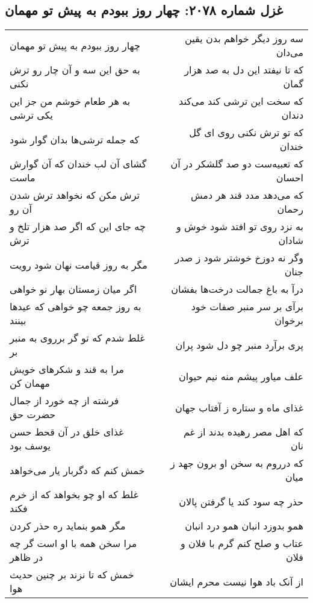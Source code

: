 \begin{center}
\section*{غزل شماره ۲۰۷۸: چهار روز ببودم به پیش تو مهمان}
\label{sec:2078}
\begin{longtable}{l p{0.5cm} r}
چهار روز ببودم به پیش تو مهمان
&&
سه روز دیگر خواهم بدن یقین می‌دان
\\
به حق این سه و آن چار رو ترش نکنی
&&
که تا نیفتد این دل به صد هزار گمان
\\
به هر طعام خوشم من جز این یکی ترشی
&&
که سخت این ترشی کند می‌کند دندان
\\
که جمله ترشی‌ها بدان گوار شود
&&
که تو ترش نکنی روی ای گل خندان
\\
گشای آن لب خندان که آن گوارش ماست
&&
که تعبیه‌ست دو صد گلشکر در آن احسان
\\
ترش مکن که نخواهد ترش شدن آن رو
&&
که می‌دهد مدد قند هر دمش رحمان
\\
چه جای این که اگر صد هزار تلخ و ترش
&&
به نزد روی تو افتد شود خوش و شادان
\\
مگر به روز قیامت نهان شود رویت
&&
وگر نه دوزخ خوشتر شود ز صدر جنان
\\
اگر میان زمستان بهار نو خواهی
&&
درآ به باغ جمالت درخت‌ها بفشان
\\
به روز جمعه چو خواهی که عیدها بینند
&&
برآی بر سر منبر صفات خود برخوان
\\
غلط شدم که تو گر برروی به منبر بر
&&
پری برآرد منبر چو دل شود پران
\\
مرا به قند و شکرهای خویش مهمان کن
&&
علف میاور پیشم منه نیم حیوان
\\
فرشته از چه خورد از جمال حضرت حق
&&
غذای ماه و ستاره ز آفتاب جهان
\\
غذای خلق در آن قحط حسن یوسف بود
&&
که اهل مصر رهیده بدند از غم نان
\\
خمش کنم که دگربار یار می‌خواهد
&&
که درروم به سخن او برون جهد ز میان
\\
غلط که او چو بخواهد که از خرم فکند
&&
حذر چه سود کند یا گرفتن پالان
\\
مگر همو بنماید ره حذر کردن
&&
همو بدوزد انبان همو درد انبان
\\
مرا سخن همه با او است گر چه در ظاهر
&&
عتاب و صلح کنم گرم با فلان و فلان
\\
خمش که تا نزند بر چنین حدیث هوا
&&
از آنک باد هوا نیست محرم ایشان
\\
\end{longtable}
\end{center}
